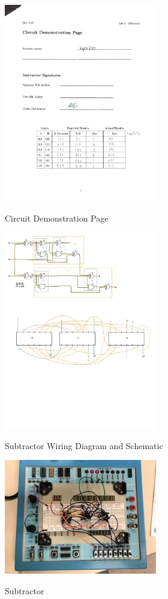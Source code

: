 \documentclass[11pt]{article}
\begin{document}
\begin{center}
	
	\includegraphics[width=0.5\textwidth]{circuit demo page 4}
	
	\caption{Circuit Demonstration Page}
	
	\includegraphics[width=0.5\textwidth]{schematic}
	
	\caption{Subtractor Wiring Diagram and Schematic}
	
	\includegraphics[width=0.5\textwidth]{subtractor}
	
	\caption{Subtractor}
	
\end{center}
\end{document}
